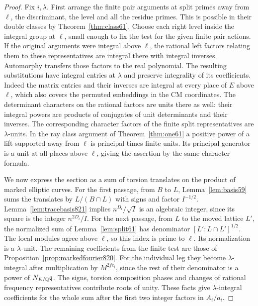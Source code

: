 \documentclass[a4paper,11pt]{article}
\theoremstyle{definition}
\theoremstyle{remark}
\numberwithin{equation}{section}
\begin{document}
\begin{proof}
Fix \(i,\lambda\). First arrange the finite pair arguments
at split primes away from \(\ell\), the discriminant, the level
and all the residue primes. This is possible in their double
classes by Theorem~\ref{thm:class61}. Choose each right level
inside the integral group at \(\ell\), small enough to fix the
test for the given finite pair actions. If the original arguments
were integral above \(\ell\), the rational left factors
relating them to these representatives are integral there
with integral inverses. Automorphy transfers those factors to the
real polynomial. The resulting substitutions have integral
entries at \(\lambda\) and preserve integrality of its
coefficients. Indeed the matrix entries and their inverses
are integral at every place of \(E\) above \(\ell\), which also
covers the permuted embeddings in the CM coordinates.
The determinant characters on the rational factors are units
there as well: their integral powers are products of conjugates
of unit determinants and their inverses. The corresponding
character factors of the finite split representatives are
\(\lambda\)-units. In the ray class argument of
Theorem~\ref{thm:one61} a positive power of a lift supported
away from \(\ell\) is principal times finite units. Its
principal generator is a unit at all places above \(\ell\),
giving the assertion by the same character formula.

We now express the section as a sum of torsion translates on
the product of marked elliptic curves. For the first passage,
from \(B\) to \(L\), Lemma~\ref{lem:basis59} sums the translates
by \(L/(B\cap L)\) with signs and factor \(I^{-1/2}\).
Lemma~\ref{lem:tracebasis821} implies
\(n^{D_i}/\sqrt I\) is an algebraic integer, since its square
is the integer \(n^{2D_i}/I\). For the next passage, from
\(L\) to the moved lattice \(L'\), the normalized sum of
Lemma~\ref{lem:split61} has denominator
\([L':L\cap L']^{1/2}\). The local modules agree above \(\ell\),
so this index is prime to \(\ell\). Its normalization is a
\(\lambda\)-unit. The remaining coefficients from the finite
test are those of Proposition~\ref{prop:markedfourier820}.
For the individual leg they become \(\lambda\)-integral after
multiplication by \(M^{2f e_i}\), since the rest of their
denominator is a power of \(N_{E/\mathbb Q}\mathfrak q\).
The signs, torsion composition phases and changes of rational
frequency representatives contribute roots of unity.
These facts give \(\lambda\)-integral coefficients for the
whole sum after the first two integer factors in \(A_i/a_i\).


\end{proof}
\end{document}
